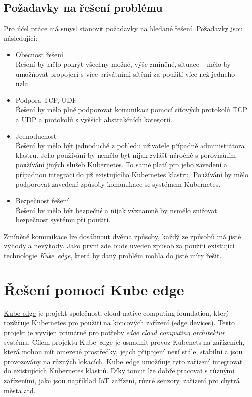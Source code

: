 \subsection{Požadavky na řešení problému}\label{sec:pozadavky}
Pro účel práce má smysl stanovit požadavky na hledané řešení. Požadavky jsou následující:
\begin{itemize}
    \item Obecnost řešení\\
    Řešení by mělo pokrýt všechny možné, výše zmíněné, situace -- mělo by umožňovat propojení s více privátními sítěmi za použití více než jednoho uzlu.
    \item Podpora TCP, UDP\\
    Řešení by mělo plně podporovat komunikaci pomocí síťových protokolů TCP a UDP a protokolů z vyšších abstrakčních kategorií.
    \item Jednoduchost\\
    Řešení by mělo být jednoduché z pohledu uživatele případně administrátora klastru. Jeho používání by nemělo být nijak zvlášť náročné s porovnáním používání jiných služeb Kubernetes. To samé platí pro jeho zavedení a případnou integraci do již existujícího Kubernetes klastru. Používání by mělo podporovat zavedené způsoby komunikace se systémem Kubernetes.
    \item Bezpečnost řešení\\
    Řešení by mělo být bezpečné a nijak významně by nemělo snižovat bezpečnost systému při použití.
\end{itemize}

\bigskip


Zmíněné komunikace lze dosáhnout dvěma způsoby, každý ze způsobů má jisté výhody a nevýhody. Jako první zde bude uveden způsob za použití existující technologie \textit{Kube~edge}, která by daný problém mohla do jisté míry řešit.
\section{Řešení pomocí Kube edge}
\href{https://kubeedge.io/}{Kube edge} je projekt společnosti cloud native computing foundation, který rozšiřuje Kubernetes pro použití na koncových zařízení (edge devices). Tento projekt je vyvíjen primárně pro potřeby \textit{edge cloud computing architektur} systému. \cite{bigelow_2021_what} Cílem projektu Kube~edge je usnadnit provoz Kubenets na zařízeních, která mohou mít omezené prostředky, jejich připojení není stále, stabilní a jsou provozovány na různých lokacích. Kube~edge umožňuje tyto zařízení integrovat do existujících Kubernetes klastrů. Díky tomut lze dobře pracovat s různými zařízeními, jako jsou například IoT zařízení, různé senzory, zařízení pro chytrá města atd. \cite{kubeedgeprojectauthors_2023_kubeedge}

